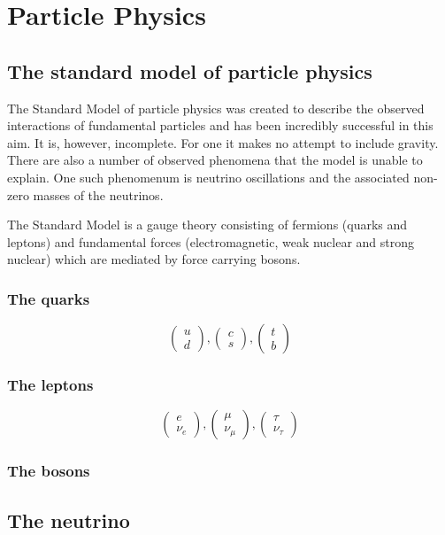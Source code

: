 \chapter{Particle Physics}
\label{chap:particle-physics}

\section{The standard model of particle physics}

The Standard Model of particle physics was created to describe the observed interactions of fundamental particles and has been incredibly successful in this aim. It is, however, incomplete. For one it makes no attempt to include gravity. There are also a number of observed phenomena that the model is unable to explain. One such phenomenum is neutrino oscillations and the associated non-zero masses of the neutrinos. 

The Standard Model is a   \CrossProduct {} gauge theory consisting of fermions (quarks and leptons) and fundamental forces (electromagnetic, weak nuclear and strong nuclear) which are mediated by force carrying bosons.

\subsection{The quarks}

\begin{equation}
  \begin{pmatrix}
    u \\
    d
  \end{pmatrix}
  ,
  \begin{pmatrix}
    c \\
    s
  \end{pmatrix}
  ,
  \begin{pmatrix}
    t \\
    b
  \end{pmatrix}
\end{equation}

\subsection{The leptons}

\begin{equation}
  \begin{pmatrix}
    e \\
    \nu_{e}
  \end{pmatrix}
  ,
  \begin{pmatrix}
    \mu \\
    \nu_{\mu}
  \end{pmatrix}
  ,
  \begin{pmatrix}
    \tau \\
    \nu_{\tau}
  \end{pmatrix}
\end{equation}


\subsection{The bosons}

\section{The neutrino}

